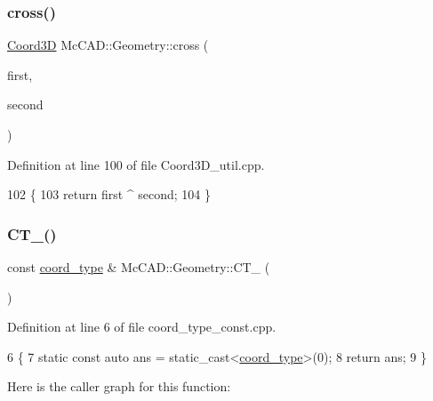 \subsubsection{\texorpdfstring{cross()}{cross()}}
{\footnotesize\ttfamily \hyperlink{classMcCAD_1_1Geometry_1_1Coord3D}{Coord3D} Mc\+C\+A\+D\+::\+Geometry\+::cross (\begin{DoxyParamCaption}\item[{const \hyperlink{classMcCAD_1_1Geometry_1_1Coord3D}{Coord3D} \&}]{first,  }\item[{const \hyperlink{classMcCAD_1_1Geometry_1_1Coord3D}{Coord3D} \&}]{second }\end{DoxyParamCaption})}



Definition at line 100 of file Coord3\+D\+\_\+util.\+cpp.


\begin{DoxyCode}
102                               \{
103     \textcolor{keywordflow}{return} first ^ second;
104 \}
\end{DoxyCode}
\mbox{\label{namespaceMcCAD_1_1Geometry_ac29462a1071e96a3eb0bce1b4097af64}} 
\subsubsection{\texorpdfstring{C\+T\+\_()}{CT\_0()}}
{\footnotesize\ttfamily const \hyperlink{namespaceMcCAD_1_1Geometry_ac043b37a4a7e849fca22869e1982d2f8}{coord\+\_\+type} \& Mc\+C\+A\+D\+::\+Geometry\+::\+C\+T\+\_ (\begin{DoxyParamCaption}{ }\end{DoxyParamCaption})}



Definition at line 6 of file coord\+\_\+type\+\_\+const.\+cpp.


\begin{DoxyCode}
6                    \{
7     \textcolor{keyword}{static} \textcolor{keyword}{const} \textcolor{keyword}{auto} ans = \textcolor{keyword}{static\_cast<}\hyperlink{namespaceMcCAD_1_1Geometry_ac043b37a4a7e849fca22869e1982d2f8}{coord\_type}\textcolor{keyword}{>}(0);
8     \textcolor{keywordflow}{return} ans;
9 \}
\end{DoxyCode}
Here is the caller graph for this function\+:
\mbox{\label{namespaceMcCAD_1_1Geometry_ad34c7456a52e2372fad7d4824eaa9e23}} 
